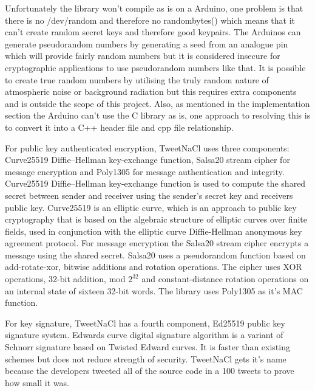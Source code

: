 Unfortunately the library won't compile as is on a Arduino, one problem is that there is no /dev/random and therefore no randombytes() which means that it can't create random secret keys and therefore good keypairs. The Arduinos can generate pseudorandom numbers by generating a seed from an analogue pin which will provide fairly random numbers but it is considered insecure for cryptographic applications to use pseudorandom numbers like that\cite{arduinopseudo}. It is possible to create true random numbers by utilising the truly random nature of atmospheric noise or background radiation but this requires extra components and is outside the scope of this project. Also, as mentioned in the implementation section the Arduino can't use the C library as is, one approach to resolving this is to convert it into a C++ header file and cpp file relationship.

For public key authenticated encryption, TweetNaCl uses three components: Curve25519 Diffie–Hellman key-exchange function, Salsa20 stream cipher for message encryption and Poly1305 for message authentication and integrity. Curve25519 Diffie–Hellman key-exchange function is used to compute the shared secret between sender and receiver using the sender's secret key and receivers public key. Curve25519 is an elliptic curve, which is an approach to public key cryptography that is based on the algebraic structure of elliptic curves over finite fields, used in conjunction with the elliptic curve Diffie-Hellman anonymous key agreement protocol\cite{curve}. For message encryption the Salsa20 stream cipher encrypts a message using the shared secret. Salsa20 uses a pseudorandom function based on add-rotate-xor, bitwise additions and rotation operations. The cipher uses XOR operations, 32-bit addition, mod $2^{32}$ and constant-distance rotation operations on an internal state of sixteen 32-bit words\cite{salsa}. The library uses Poly1305 as it's MAC function\cite{poly}.

For key signature, TweetNaCl has a fourth component, Ed25519 public key signature system. Edwards curve digital signature algorithm is a variant of Schnorr signature based on Twisted Edward curves. It is faster than existing schemes but does not reduce strength of security\cite{ed25}. TweetNaCl gets it's name because the developers tweeted all of the source code in a 100 tweets to prove how small it was.


